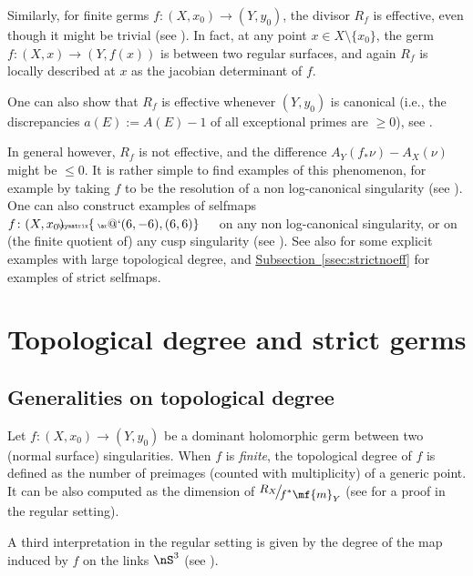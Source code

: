 \documentclass[11 pt, twoside, a4paper]{amsart}
\makeatletter
\def\nfrac#1#2{%
    \raise.5ex\hbox{\small{$#1$}}%
    \kern-.18em\big/\kern-.2em%
    \lower.5ex\hbox{\small{$#2$}}}
\newcommand{\Kd}{{a}}
\newcommand{\Kld}{{A}}
\newcommand{\selfarrow}[1][]{\tiny{\!\!\!\xymatrix{\phantom{|}\ar@`{(6,-6),(6,6)}}\hspace{4mm}}}
\theoremstyle{definition}
\theoremstyle{definition}
\newcommand{\JD}[1]{R_{#1}}
\newcommand{\refssec}[1]{\hyperref[ssec:#1]{Subsection~\ref*{ssec:#1}}}
\makeatother
\begin{document}
Similarly, for finite germs $f \colon (X,x_0) \to (Y,y_0)$, the divisor $\JD{f}$ is effective, even though it might be trivial (see \cite[Theorem B]{favre:holoselfmapssingratsurf}).
In fact, at any point $x \in X \setminus \{x_0\}$, the germ $f \colon (X,x) \to (Y,f(x))$ is between two regular surfaces, and again $\JD{f}$ is locally described at $x$ as the jacobian determinant of $f$.

One can also show that $\JD{f}$ is effective whenever $(Y,y_0)$ is canonical (i.e., the discrepancies $\Kd(E):=\Kld(E)-1$ of all exceptional primes are $\geq 0$), see \cite[Proposition 4.33]{gignac-ruggiero:locdynnoninvnormsurfsing}.

In general however, $\JD{f}$ is not effective, and the difference
$
\Kld_Y(f_*\nu)- \Kld_X(\nu) 
$
might be $\leq 0$.
It is rather simple to find examples of this phenomenon, for example by taking $f$ to be the resolution of a non log-canonical singularity (see \cite[Example 4.29]{gignac-ruggiero:locdynnoninvnormsurfsing}).
One can also construct examples of selfmaps $f \colon (X,x_0) \selfarrow$ on any non log-canonical singularity, or on (the finite quotient of) any cusp singularity (see \cite[Remark 4.32]{gignac-ruggiero:locdynnoninvnormsurfsing}).
See also \cite[Chapter 9]{gignac-ruggiero:locdynnoninvnormsurfsing} for some explicit examples with large topological degree, and \refssec{strictnoeff} for examples of strict selfmaps.

\section{Topological degree and strict germs}\label{sec:topdegstrict}

\subsection{Generalities on topological degree}

Let $f \colon (X,x_0) \to (Y,y_0)$ be a dominant holomorphic germ between two (normal surface) singularities.
When $f$ is \emph{finite},
the topological degree of $f$ is defined as the number of preimages (counted with multiplicity) of a generic point. It can be also computed as the dimension of $\nfrac{R_X}{f^*\mf{m}_Y}$  (see \cite[Section 5.4 Proposition 2]{arnold-guseinzade-varchenko:singdiffmaps1} for a proof in the regular setting).

A third interpretation in the regular setting is given by the degree of the map induced by $f$ on the links $\nS^{3}$ (see \cite[Section 5.2 Theorem 1]{arnold-guseinzade-varchenko:singdiffmaps1}).
\end{document}
